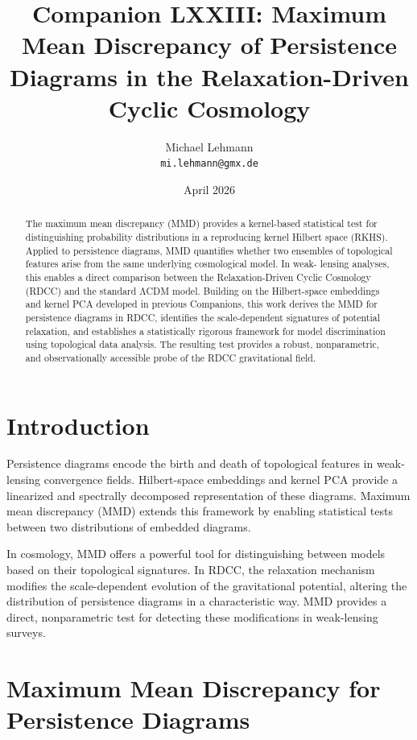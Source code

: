 \documentclass[11pt,a4paper]{article}
\title{\textbf{Companion LXXIII: Maximum Mean Discrepancy of Persistence Diagrams in the Relaxation-Driven Cyclic Cosmology}}
\author{Michael Lehmann \\ \texttt{mi.lehmann@gmx.de}}
\date{April 2026}
\begin{document}
\maketitle

\begin{abstract}
The maximum mean discrepancy (MMD) provides a kernel-based statistical test for 
distinguishing probability distributions in a reproducing kernel Hilbert space 
(RKHS). Applied to persistence diagrams, MMD quantifies whether two ensembles of 
topological features arise from the same underlying cosmological model. In weak-
lensing analyses, this enables a direct comparison between the Relaxation-Driven 
Cyclic Cosmology (RDCC) and the standard ΛCDM model. Building on the Hilbert-space 
embeddings and kernel PCA developed in previous Companions, this work derives the 
MMD for persistence diagrams in RDCC, identifies the scale-dependent signatures of 
potential relaxation, and establishes a statistically rigorous framework for 
model discrimination using topological data analysis. The resulting test provides 
a robust, nonparametric, and observationally accessible probe of the RDCC 
gravitational field.
\end{abstract}
\section{Introduction}

Persistence diagrams encode the birth and death of topological features in weak-
lensing convergence fields. Hilbert-space embeddings and kernel PCA provide a 
linearized and spectrally decomposed representation of these diagrams. Maximum 
mean discrepancy (MMD) extends this framework by enabling statistical tests 
between two distributions of embedded diagrams.

In cosmology, MMD offers a powerful tool for distinguishing between models based 
on their topological signatures. In RDCC, the relaxation mechanism modifies the 
scale-dependent evolution of the gravitational potential, altering the distribution 
of persistence diagrams in a characteristic way. MMD provides a direct, 
nonparametric test for detecting these modifications in weak-lensing surveys.
\section{Maximum Mean Discrepancy for Persistence Diagrams}
\end{document}
